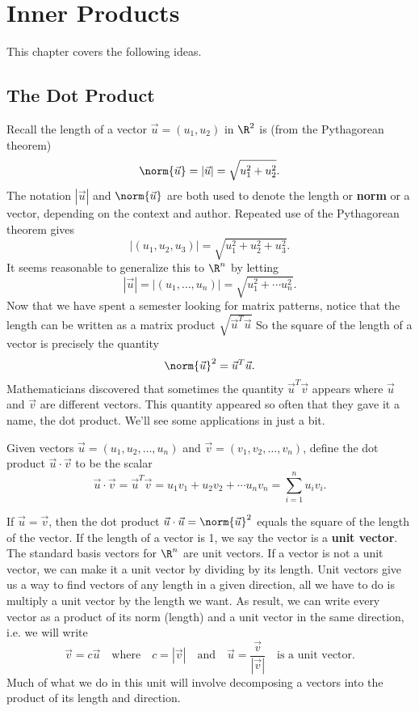\chapter{Inner Products}

This chapter covers the following ideas.



\section{The Dot Product}

Recall the length of a vector $\vec u = (u_1,u_2)$ in $\R^2$ is (from the Pythagorean theorem) 
$$\norm{\vec u} = |\vec u| = \sqrt{u_1^2+u_2^2}.$$ 
The notation $|\vec u|$ and $\norm{\vec u}$ are both used to denote the length or \textbf{norm} or a vector, 
depending on the context and author.  
Repeated use of the Pythagorean theorem gives $$|(u_1,u_2,u_3)|=\sqrt{u_1^2+u_2^2+u_3^2}.$$ 
It seems reasonable to generalize this to $\R^n$ by letting $$|\vec u|=|(u_1,\ldots,u_n)| = \sqrt{u_1^2+\cdots u_n^2}.$$ 
Now that we have spent a semester looking for matrix patterns, notice that the length can be written as a matrix product  $\sqrt{\vec u^T \vec u}$
So the square of the length of a vector is precisely the quantity $$\norm{\vec u}^2 = \vec u^T\vec u.$$  
Mathematicians discovered that sometimes the quantity $\vec u^T\vec v$ appears where $\vec u$ and $\vec v$ are different vectors.  This quantity appeared so often that they gave it a name, the dot product. We'll see some applications in just a bit.

\begin{definition}
Given vectors $\vec u = (u_1,u_2,\ldots, u_n)$ and $\vec v = (v_1,v_2,\ldots, v_n)$, define the dot product $\vec u \cdot \vec v$ to be the scalar 
$$\vec u \cdot\vec v = \vec u^T\vec v = u_1v_1+u_2v_2+\cdots u_nv_n = \sum_{i=1}^n u_iv_i. $$
\end{definition}
If $\vec u = \vec v$, then the dot product $\vec u\cdot \vec u= \norm{\vec u}^2$ equals the square of the length of the vector. 
If the length of a vector is 1, we say the vector is a \textbf{unit vector}. 
The standard basis vectors for $\R^n$ are unit vectors. 
If a vector is not a unit vector, we can make it a unit vector by dividing by its length. 
Unit vectors give us a way to find vectors of any length in a given direction, all we have to do is multiply a unit vector by the length we want. 
As result, we can write every vector as a product of its norm (length) and a unit vector in the same direction, i.e. we will write $$\vec v= c\vec u\quad \text{where}\quad c=|\vec v|\quad \text{and}\quad\vec u =\frac{\vec v}{|\vec v|} \quad \text{is a unit vector}.$$ 
Much of what we do in this unit will involve decomposing a vectors into the product of its length and direction.


